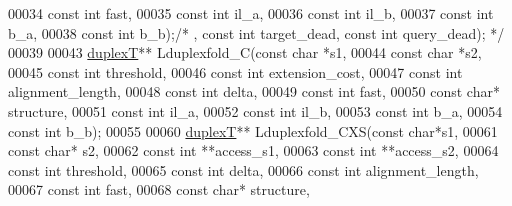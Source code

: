 \begin{DoxyCode}
00034                           \textcolor{keyword}{const} \textcolor{keywordtype}{int} fast,
00035                           \textcolor{keyword}{const} \textcolor{keywordtype}{int} il\_a,
00036                           \textcolor{keyword}{const} \textcolor{keywordtype}{int} il\_b,
00037                           \textcolor{keyword}{const} \textcolor{keywordtype}{int} b\_a,
00038                           \textcolor{keyword}{const} \textcolor{keywordtype}{int} b\_b);\textcolor{comment}{/* , const int target\_dead, const int query\_dead); */}
00039 
00043 \hyperlink{group__data__structures_structduplexT}{duplexT}** Lduplexfold\_C(\textcolor{keyword}{const} \textcolor{keywordtype}{char} *s1,
00044                         \textcolor{keyword}{const} \textcolor{keywordtype}{char} *s2,
00045                         \textcolor{keyword}{const} \textcolor{keywordtype}{int} threshold,
00046                         \textcolor{keyword}{const} \textcolor{keywordtype}{int} extension\_cost,
00047                         \textcolor{keyword}{const} \textcolor{keywordtype}{int} alignment\_length,
00048                         \textcolor{keyword}{const} \textcolor{keywordtype}{int} delta,
00049                         \textcolor{keyword}{const} \textcolor{keywordtype}{int} fast,
00050                         \textcolor{keyword}{const} \textcolor{keywordtype}{char}* structure,
00051                         \textcolor{keyword}{const} \textcolor{keywordtype}{int} il\_a,
00052                         \textcolor{keyword}{const} \textcolor{keywordtype}{int} il\_b,
00053                         \textcolor{keyword}{const} \textcolor{keywordtype}{int} b\_a,
00054                         \textcolor{keyword}{const} \textcolor{keywordtype}{int} b\_b);
00055 
00060 \hyperlink{group__data__structures_structduplexT}{duplexT}** Lduplexfold\_CXS(\textcolor{keyword}{const} \textcolor{keywordtype}{char}*s1,
00061                           \textcolor{keyword}{const} \textcolor{keywordtype}{char}* s2,
00062                           \textcolor{keyword}{const} \textcolor{keywordtype}{int} **access\_s1,
00063                           \textcolor{keyword}{const} \textcolor{keywordtype}{int} **access\_s2,
00064                           \textcolor{keyword}{const} \textcolor{keywordtype}{int} threshold,
00065                           \textcolor{keyword}{const} \textcolor{keywordtype}{int} delta,
00066                           \textcolor{keyword}{const} \textcolor{keywordtype}{int} alignment\_length,
00067                           \textcolor{keyword}{const} \textcolor{keywordtype}{int} fast,
00068                           \textcolor{keyword}{const} \textcolor{keywordtype}{char}* structure,

\end{DoxyCode}
